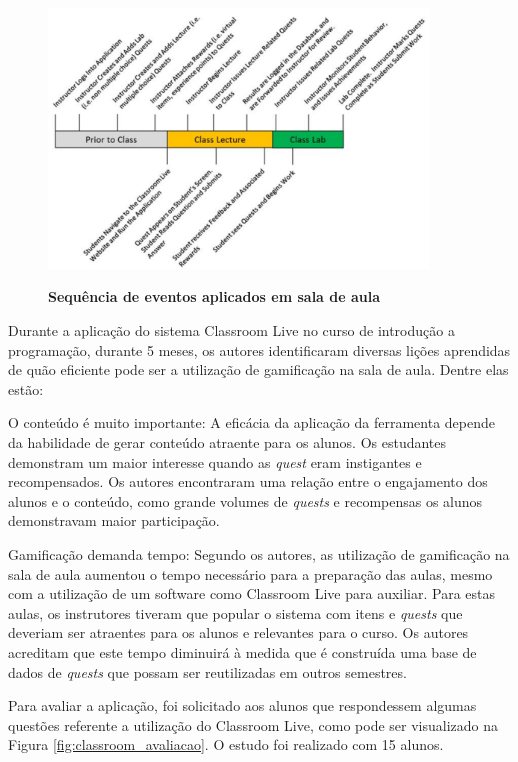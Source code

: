 \documentclass[
	12pt,				%
	oneside,			%
	a4paper,			%
	english,			%
	french,				%
	spanish,			%
	brazil,				%
	]{abntex2}
\begin{document}
\begin{figure}[ht]
\centering
\caption{\textbf{Sequência de eventos aplicados em sala de aula}}
\includegraphics[width=0.9\textwidth]{imagens/classroom_aula.png}
\label{fig:classroom_aula}
\end{figure}

Durante a aplicação do sistema Classroom Live no curso de introdução a programação, durante 5 meses, os autores identificaram diversas lições aprendidas de quão eficiente pode ser a utilização de gamificação na sala de aula. Dentre elas estão:

O conteúdo é muito importante: A eficácia da aplicação da ferramenta depende da habilidade de gerar conteúdo atraente para os alunos. Os estudantes demonstram um maior interesse quando as \textit{quest} eram instigantes e recompensados. Os autores encontraram uma relação entre o engajamento dos alunos e o conteúdo, como grande volumes de \textit{quests} e recompensas os alunos demonstravam maior participação.

Gamificação demanda tempo: Segundo os autores, as utilização de gamificação na sala de aula aumentou o tempo necessário para a preparação das aulas, mesmo com a utilização de um software como Classroom Live para auxiliar. Para estas aulas, os instrutores tiveram que popular o sistema com itens e \textit{quests} que deveriam ser atraentes para os alunos e relevantes para o curso. Os autores acreditam que este tempo diminuirá à medida que é construída uma base de dados de \textit{quests} que possam ser reutilizadas em outros semestres.

Para avaliar a aplicação, foi solicitado aos alunos que respondessem algumas questões referente a utilização do Classroom Live, como pode ser visualizado na Figura \ref{fig:classroom_avaliacao}. O estudo foi realizado com 15 alunos.
\end{document}
